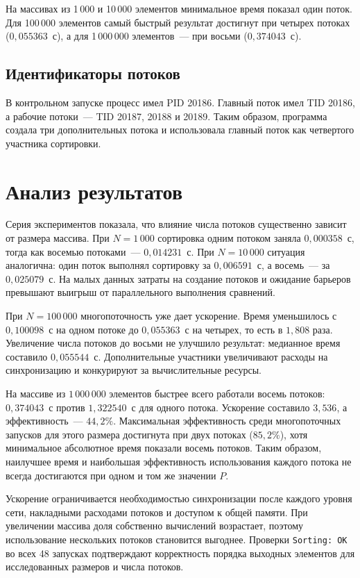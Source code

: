 \documentclass[12pt,a4paper,oneside]{article}
\begin{document}
На массивах из 1\,000 и 10\,000 элементов минимальное время показал один поток. Для 100\,000 элементов самый быстрый результат достигнут при четырех потоках ($0{,}055363$~с), а для 1\,000\,000 элементов~--- при восьми ($0{,}374043$~с).

\subsection{Идентификаторы потоков}
В контрольном запуске процесс имел PID 20186. Главный поток имел TID 20186, а рабочие потоки~--- TID 20187, 20188 и 20189. Таким образом, программа создала три дополнительных потока и использовала главный поток как четвертого участника сортировки.

\section{Анализ результатов}
Серия экспериментов показала, что влияние числа потоков существенно зависит от размера массива. При $N=1\,000$ сортировка одним потоком заняла $0{,}000358$~с, тогда как восемью потоками~--- $0{,}014231$~с. При $N=10\,000$ ситуация аналогична: один поток выполнял сортировку за $0{,}006591$~с, а восемь~--- за $0{,}025079$~с. На малых данных затраты на создание потоков и ожидание барьеров превышают выигрыш от параллельного выполнения сравнений.

При $N=100\,000$ многопоточность уже дает ускорение. Время уменьшилось с $0{,}100098$~с на одном потоке до $0{,}055363$~с на четырех, то есть в $1{,}808$ раза. Увеличение числа потоков до восьми не улучшило результат: медианное время составило $0{,}055544$~с. Дополнительные участники увеличивают расходы на синхронизацию и конкурируют за вычислительные ресурсы.

На массиве из $1\,000\,000$ элементов быстрее всего работали восемь потоков: $0{,}374043$~с против $1{,}322540$~с для одного потока. Ускорение составило $3{,}536$, а эффективность~--- $44{,}2\%$. Максимальная эффективность среди многопоточных запусков для этого размера достигнута при двух потоках ($85{,}2\%$), хотя минимальное абсолютное время показали восемь потоков. Таким образом, наилучшее время и наибольшая эффективность использования каждого потока не всегда достигаются при одном и том же значении $P$.

Ускорение ограничивается необходимостью синхронизации после каждого уровня сети, накладными расходами потоков и доступом к общей памяти. При увеличении массива доля собственно вычислений возрастает, поэтому использование нескольких потоков становится выгоднее. Проверки \texttt{Sorting: OK} во всех 48 запусках подтверждают корректность порядка выходных элементов для исследованных размеров и числа потоков.
\end{document}
